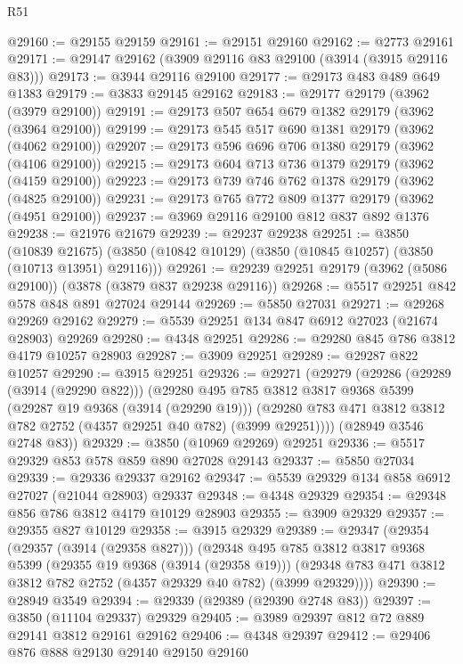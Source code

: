 \begin{lexlean}{R51}
\begin{coremodule}
@29160 := @29155 @29159
@29161 := @29151 @29160
@29162 := @2773 @29161
@29171 := @29147 @29162 (@3909 @29116 @83 @29100 (@3914 (@3915 @29116 @83)))
@29173 := @3944 @29116 @29100
@29177 := @29173 @483 @489 @649 @1383
@29179 := @3833 @29145 @29162
@29183 := @29177 @29179 (@3962 (@3979 @29100))
@29191 := @29173 @507 @654 @679 @1382 @29179 (@3962 (@3964 @29100))
@29199 := @29173 @545 @517 @690 @1381 @29179 (@3962 (@4062 @29100))
@29207 := @29173 @596 @696 @706 @1380 @29179 (@3962 (@4106 @29100))
@29215 := @29173 @604 @713 @736 @1379 @29179 (@3962 (@4159 @29100))
@29223 := @29173 @739 @746 @762 @1378 @29179 (@3962 (@4825 @29100))
@29231 := @29173 @765 @772 @809 @1377 @29179 (@3962 (@4951 @29100))
@29237 := @3969 @29116 @29100 @812 @837 @892 @1376
@29238 := @21976 @21679
@29239 := @29237 @29238
@29251 := @3850
    (@10839 @21675)
    (@3850 (@10842 @10129) (@3850 (@10845 @10257) (@3850 (@10713 @13951) @29116)))
@29261 := @29239 @29251 @29179 (@3962 (@5086 @29100)) (@3878 (@3879 @837 @29238 @29116))
@29268 := @5517 @29251 @842 @578 @848 @891 @27024 @29144
@29269 := @5850 @27031
@29271 := @29268 @29269 @29162
@29279 := @5539 @29251 @134 @847 @6912 @27023 (@21674 @28903) @29269
@29280 := @4348 @29251
@29286 := @29280 @845 @786 @3812 @4179 @10257 @28903
@29287 := @3909 @29251
@29289 := @29287 @822 @10257
@29290 := @3915 @29251
@29326 := @29271
    (@29279
      (@29286
        (@29289 (@3914 (@29290 @822)))
        (@29280
          @495
          @785
          @3812
          @3817
          @9368
          @5399
          (@29287 @19 @9368 (@3914 (@29290 @19)))
          (@29280 @783 @471 @3812 @3812 @782 @2752 (@4357 @29251 @40 @782) (@3999 @29251))))
      (@28949 @3546 @2748 @83))
@29329 := @3850 (@10969 @29269) @29251
@29336 := @5517 @29329 @853 @578 @859 @890 @27028 @29143
@29337 := @5850 @27034
@29339 := @29336 @29337 @29162
@29347 := @5539 @29329 @134 @858 @6912 @27027 (@21044 @28903) @29337
@29348 := @4348 @29329
@29354 := @29348 @856 @786 @3812 @4179 @10129 @28903
@29355 := @3909 @29329
@29357 := @29355 @827 @10129
@29358 := @3915 @29329
@29389 := @29347
    (@29354
      (@29357 (@3914 (@29358 @827)))
      (@29348
        @495
        @785
        @3812
        @3817
        @9368
        @5399
        (@29355 @19 @9368 (@3914 (@29358 @19)))
        (@29348 @783 @471 @3812 @3812 @782 @2752 (@4357 @29329 @40 @782) (@3999 @29329))))
@29390 := @28949 @3549
@29394 := @29339 (@29389 (@29390 @2748 @83))
@29397 := @3850 (@11104 @29337) @29329
@29405 := @3989 @29397 @812 @72 @889 @29141 @3812 @29161 @29162
@29406 := @4348 @29397
@29412 := @29406 @876 @888 @29130 @29140 @29150 @29160

\end{coremodule}
\end{lexlean}
